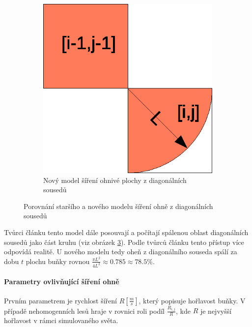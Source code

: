 \documentclass[11pt,a4paper]{scrartcl}
\begin{document}
\begin{figure}[H]
\begin{subfigure}{0.3 \textwidth}
			\label{fig:diag-model-old}
		\end{subfigure}
		\begin{subfigure} {0.3 \textwidth}
			\includegraphics[width=\linewidth]{new-model-diag-spread}
			\caption{Nový model šíření ohnivé plochy z diagonálních sousedů}
			\label{fig:diag-model-new}
		\end{subfigure}
		\caption{Porovnání staršího a nového modelu šíření ohně z diagonálních sousedů}
	\end{figure}

	Tvůrci článku tento model dále posouvají a počítají spálenou oblast diagonálních sousedů jako část kruhu (viz obrázek \ref{fig:diag-model-new}). Podle tvůrců článku tento přístup více odpovídá realitě. U nového modelu tedy oheň z diagonálního souseda spálí za dobu $t$ plochu buňky rovnou $\frac{\pi L^2}{4L^2} \approx 0.785 \approx 78.5\%$.
	
	\paragraph{Parametry ovlivňující šíření ohně} Prvním parametrem je rychlost šíření $R [\frac{m}{s}]$, který popisuje hořlavost buňky. V případě nehomogenních lesů hraje v rovnici roli podíl $\frac{R_{i,j}}{R}$, kde $R$ je nejvyšší hořlavost v rámci simulovaného světa.
	
\end{document}
